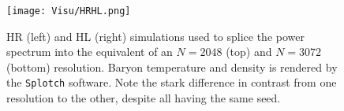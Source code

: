 



\begin{figure}
\begin{center}
\texttt{[image: Visu/HRHL.png]}
\caption{HR (left) and HL (right) simulations used to splice the power spectrum into the equivalent of an $N=2048$ (top) and $N=3072$ (bottom) resolution. Baryon temperature and density is rendered by the \texttt{Splotch} software. Note the stark difference in contrast from one resolution to the other, despite all having the same seed.}
\end{center}
\label{fig:visu_splice}
\end{figure}

\clearpage